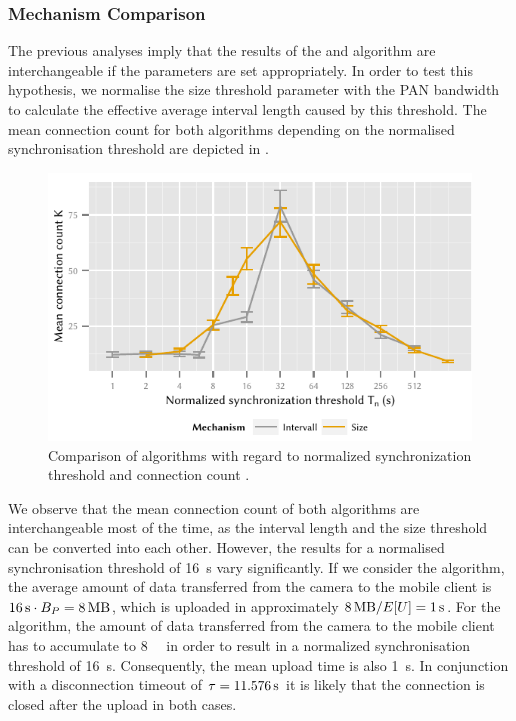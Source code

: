 \subsubsection*{Mechanism Comparison}\label{sec:application:cloud_file_synchronisation:numerical_evaluation:mechanism_comparison}
The previous analyses imply that the results of the \algointerval and \algosize algorithm are interchangeable if the parameters are set appropriately.
In order to test this hypothesis, we normalise the size threshold parameter \thresholdSize with the \gls{PAN} bandwidth to calculate the effective average interval length caused by this threshold.
The mean connection count \connectionCount for both algorithms depending on the normalised synchronisation threshold \thresholdNormalised are depicted in . 
\begin{figure}
  \includegraphics{application/cloud_file_synchronization/numerical_evaluation/figures/comparison}
  \caption{Comparison of algorithms with regard to normalized synchronization threshold \thresholdNormalised and connection count \connectionCount.}
  \label{fig:application:cloud_file_synchronisation:numerical_evaluation:mechanism_comparison:comparison}
\end{figure}

We observe that the mean connection count \connectionCount of both algorithms are interchangeable most of the time, as the interval length \thresholdInterval and the size threshold \thresholdSize can be converted into each other.
However, the results for a normalised synchronisation threshold \thresholdNormalised of \SI{16}{\second} vary significantly.
If we consider the \algointerval algorithm, the average amount of data transferred from the camera to the mobile client is \(\SI{16}{\second} \cdot \panTransferRate=\SI{8}{\mega\byte}\), which is uploaded in approximately \(\SI{8}{\mega\byte} / E[U] = \SI{1}{\second}\).
For the \algosize algorithm, the amount of data transferred from the camera to the mobile client has to accumulate to \SI{8}{\mega\byte} in order to result in a normalized synchronisation threshold \thresholdNormalised of \SI{16}{\second}.
Consequently, the mean upload time is also \SI{1}{\second}.
In conjunction with a disconnection timeout of \(\tau = \SI{11.576}{\second}\) it is likely that the connection is closed after the upload in both cases.

